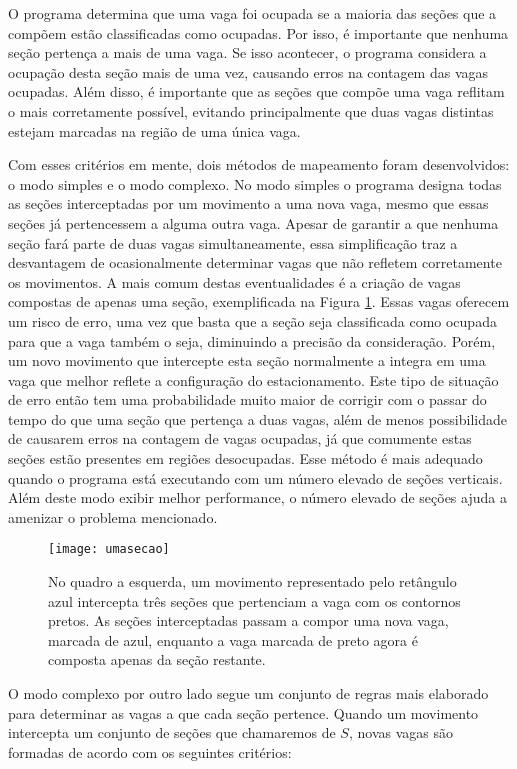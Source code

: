 O programa determina que uma vaga foi ocupada se a maioria das seções que a compõem estão classificadas como ocupadas. Por isso, é importante que nenhuma seção pertença a mais de uma vaga. Se isso acontecer, o programa considera a ocupação desta seção mais de uma vez, causando erros na contagem das vagas ocupadas. Além disso, é importante que as seções que compõe uma vaga reflitam o mais corretamente possível, evitando principalmente que duas vagas distintas estejam marcadas na região de uma única vaga. 

Com esses critérios em mente, dois métodos de mapeamento foram desenvolvidos: o modo simples e o modo complexo. No modo simples o programa designa todas as seções interceptadas por um movimento a uma nova vaga, mesmo que essas seções já pertencessem a alguma outra vaga. Apesar de garantir a que nenhuma seção fará parte de duas vagas simultaneamente, essa simplificação traz a desvantagem de ocasionalmente determinar vagas que não refletem corretamente os movimentos. A mais comum destas eventualidades é a criação de vagas compostas de apenas uma seção, exemplificada na Figura \ref{fig:umasecao}. Essas vagas oferecem um risco de erro, uma vez que basta que a seção seja classificada como ocupada para que a vaga também o seja, diminuindo a precisão da consideração. Porém, um novo movimento que intercepte esta seção normalmente a integra em uma vaga que melhor reflete a configuração do estacionamento. Este tipo de situação de erro então tem uma probabilidade muito maior de corrigir com o passar do tempo do que uma seção que pertença a duas vagas, além de menos possibilidade de causarem erros na contagem de vagas ocupadas, já que comumente estas seções estão presentes em regiões desocupadas. Esse método é mais adequado quando o programa está executando com um número elevado de seções verticais. Além deste modo exibir melhor performance, o número elevado de seções ajuda a amenizar o problema mencionado.


\begin{figure}%
\centering
\texttt{[image: umasecao]}%
\caption{No quadro a esquerda, um movimento representado pelo retângulo azul intercepta três seções que pertenciam a vaga com os contornos pretos. As seções interceptadas passam a compor uma nova vaga, marcada de azul, enquanto a vaga marcada de preto agora é composta apenas da seção restante.}%
\label{fig:umasecao}%
\centering
\end{figure}

O modo complexo por outro lado segue um conjunto de regras mais elaborado para determinar as vagas a que cada seção pertence. Quando um movimento intercepta um conjunto de seções que chamaremos de $S$, novas vagas são formadas de acordo com os seguintes critérios:

